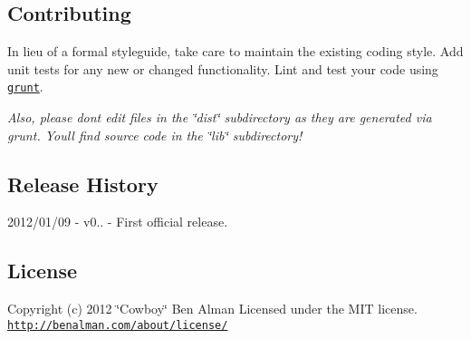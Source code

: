 \subsection*{Contributing}

In lieu of a formal styleguide, take care to maintain the existing coding style. Add unit tests for any new or changed functionality. Lint and test your code using \href{https://github.com/cowboy/grunt}{\tt grunt}.

{\itshape Also, please don\textquotesingle{}t edit files in the \char`\"{}dist\char`\"{} subdirectory as they are generated via grunt. You\textquotesingle{}ll find source code in the \char`\"{}lib\char`\"{} subdirectory!}

\subsection*{Release History}

2012/01/09 -\/ v0.. -\/ First official release.

\subsection*{License}

Copyright (c) 2012 \char`\"{}\+Cowboy\char`\"{} Ben Alman Licensed under the M\+I\+T license. \href{http://benalman.com/about/license/}{\tt http\+://benalman.\+com/about/license/} 